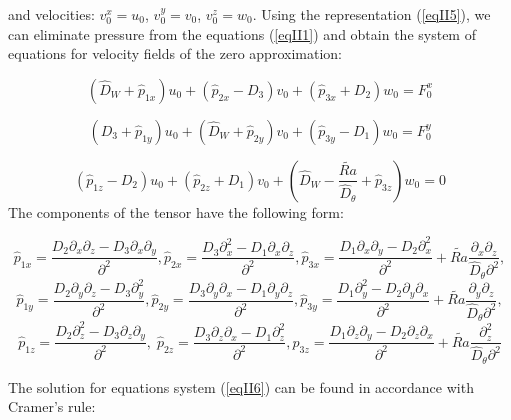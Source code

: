 \documentclass [12pt]{article}
\begin{document}
and velocities: $v_{0}^{x} =u_{0} $, $v_{0}^{y} =v_{0} $, $v_{0}^{z} =w_{0} $.
Using the representation (\ref{eqII5}), we can eliminate pressure from the equations  (\ref{eqII1}) and obtain the system of equations for  velocity fields of the zero approximation:

\[\left(\widehat{D}_{W} +\widehat{p}_{1x} \right)u_{0} +\left(\widehat{p}_{2x} -D_{3}
\right)v_{0} +\left(\widehat{p}_{3x} +D_{2} \right)w_{0} =F_{0}^{x} \]

\begin{equation}\label{eqII6}
\left(D_{3}
+\widehat{p}_{1y} \right)u_{0} +\left(\widehat{D}_{W} +\widehat{p}_{2y} \right)v_{0} +\left(
\widehat{p}_{3y} -D_{1} \right)w_{0} =F_{0}^{y}
\end{equation}

  \[\left(\widehat{p}_{1z} -D_{2} \right)u_{0} +\left(\widehat{p}_{2z} +D_{1} \right)v_{0}
+\left(\widehat{D}_{W} -\frac{\widetilde{Ra}}{\widehat{D}_{\theta}} +\widehat{p}_{3z} \right)w_{0} =0\]
The components of the tensor have the following form:

\[\widehat{p}_{1x} =\frac{D_{2} \partial _{x}
\partial _{z} -D_{3} \partial _{x} \partial _{y} }{\partial ^{2} } ,\widehat{p}_{2x}
=\frac{D_{3} \partial ^{2} _{x} -D_{1} \partial _{x} \partial _{z} }{\partial ^{2}
} ,\widehat{p}_{3x} =\frac{D_{1} \partial _{x} \partial _{y} -D_{2} \partial ^{2}
_{x} }{\partial ^{2} }+\widetilde{Ra} \frac{{\partial _x}{\partial _z }}{{\hat D_\theta \partial^2 }} ,\]
\begin{equation} \label{eqII7}
\widehat{p}_{1y} =\frac{D_{2} \partial _{y} \partial _{z}
-D_{3} \partial ^{2} _{y} }{\partial ^{2} }  , \widehat{p}_{2y} =\frac{D_{3} \partial
_{y} \partial _{x} -D_{1} \partial _{y} \partial _{z} }{\partial ^{2} } ,\widehat{p}_{3y}
=\frac{D_{1} \partial ^{2} _{y} -D_{2} \partial _{y} \partial _{x} }{\partial ^{2}
}+\widetilde{Ra} \frac{{\partial _y}{\partial _z }}{{\hat D_\theta \partial^2 }} ,
\end{equation}
\[ \widehat{p}_{1z} =\frac{D_{2} \partial ^{2} _{z} -D_{3} \partial _{z} \partial
_{y} }{\partial ^{2} } ,\; \widehat{p}_{2z} =\frac{D_{3} \partial _{z} \partial _{x}
-D_{1} \partial ^{2} _{z} }{\partial ^{2} } , \widehat{p}_{3z} =\frac{D_{1} \partial
_{z} \partial _{y} -D_{2} \partial _{z} \partial _{x} }{\partial ^{2}}+\widetilde{Ra} \frac{\partial^{2}_{z}}{{\hat D_\theta \partial^2 }}\]

The solution for equations system (\ref{eqII6}) can be found in accordance with Cramer's rule:
\end{document}
